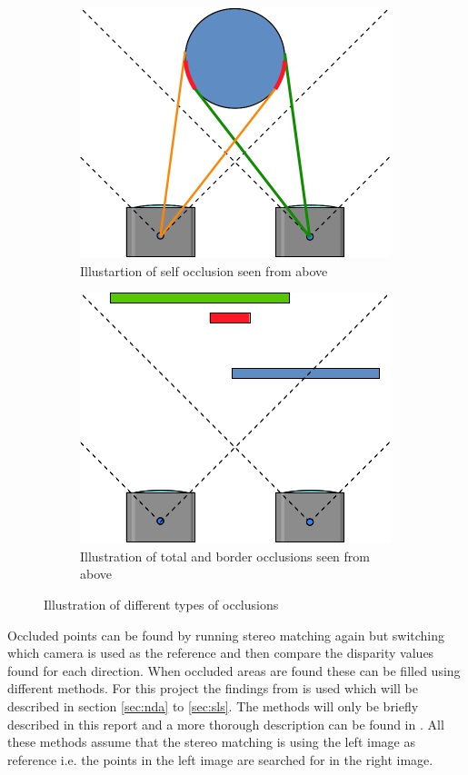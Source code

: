 \begin{figure}[ht!]
  \centering
  \begin{subfigure}[t]{0.45\textwidth}
    \centering\includegraphics[scale=0.4]{figures/occlself.jpg}
    \caption{Illustartion of self occlusion seen from above\label{fig:occlself}}
  \end{subfigure}\hspace{0.5cm}
  \begin{subfigure}[t]{0.45\textwidth}
    \centering\includegraphics[scale=0.4]{figures/occltotalborder}
    \caption{Illustration of total and border occlusions seen from above\label{fig:occltb}}
  \end{subfigure}
  \caption{Illustration of different types of occlusions\label{fig:occltypes}}
\end{figure}

Occluded points can be found by running stereo matching again but switching which camera is used as the reference and then compare the disparity values found for each direction. When occluded areas are found these can be filled using different methods. For this project the findings from \cite{huq2013occlusion} is used which will be described in section \vref{sec:nda} to \vref{sec:sls}. The methods will only be briefly described in this report and a more thorough description can be found in \cite{huq2013occlusion}. All these methods assume that the stereo matching is using the left image as reference i.e. the points in the left image are searched for in the right image. 

